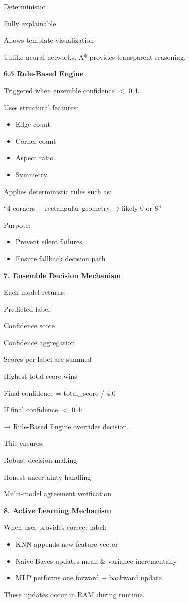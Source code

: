 \documentclass[9pt,a4paper]{extarticle}
\newcommand{\Sec}[1]{\vspace{2pt}\noindent\textbf{#1}\par\vspace{2pt}}
\newcommand{\Sub}[1]{\vspace{2pt}\noindent\textbf{#1}\par\vspace{1pt}}
\begin{document}
Deterministic
\newpage

Fully explainable

Allows template visualization

Unlike neural networks, A* provides transparent reasoning.

\Sub{6.5 Rule-Based Engine}
Triggered when ensemble confidence $<$ 0.4.

Uses structural features:
\begin{itemize}
\item Edge count
\item Corner count
\item Aspect ratio
\item Symmetry
\end{itemize}
Applies deterministic rules such as:

“4 corners + rectangular geometry → likely 0 or 8”

Purpose:
\begin{itemize}
\item Prevent silent failures
\item Ensure fallback decision path
\end{itemize}

\Sec{7. Ensemble Decision Mechanism}
Each model returns:

Predicted label

Confidence score

Confidence aggregation

Scores per label are summed

Highest total score wins

Final confidence = total\_score / 4.0

If final confidence $<$ 0.4:

→ Rule-Based Engine overrides decision.

This ensures:

Robust decision-making
\newpage

Honest uncertainty handling

Multi-model agreement verification

\Sec{8. Active Learning Mechanism}
When user provides correct label:
\begin{itemize}
\item KNN appends new feature vector
\item Naive Bayes updates mean \& variance incrementally
\item MLP performs one forward + backward update
\end{itemize}
These updates occur in RAM during runtime.
\end{document}
